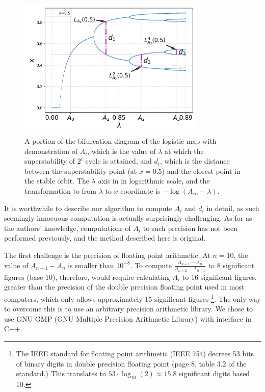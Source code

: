 \begin{figure}
	\centering
	\includegraphics[width=0.8\textwidth]{./figures/demonstration of feigenbaum constants.png}
	\caption{ 
		A portion of the bifurcation diagram of the logistic map with demonstration of  $A_i$, which is the value of $\lambda$ at which the superstability of $2^i$ cycle is attained, and $d_i$, which is the distance between the superstability point (at $x=0.5$) and the closest point in the stable orbit.
		The $\lambda$ axis in in logarithmic scale, and the transformation to from $\lambda$ to $x$ coordinate is $-\log(A_{\infty} - \lambda)$.
	}
	\label{fig:demonstration of feigenbaum constants on logistic map}
\end{figure}

It is worthwhile to describe our algorithm to compute $A_i$ and $d_i$ in detail, as such seemingly innocuous computation is actually surprisingly challenging.
As for as the authors' knowledge, computations of $A_i$ to such precision has not been performed previously, and the method described here is original.

The first challenge is the precision of floating point arithmetic.
At $n = 10$, the value of $A_{n+1} -A_{n} $ is smaller than $ 10^{-8}$. 
To compute $\frac{A_{n+1} - A_n}{A_{n+2} - A_{n+1}}$ to $8$ significant figures (base 10), therefore, would require calculating $A_i$ to 16 significant figures, greater than the precision of the double precision floating point used in most computers, which only allows approximately 15 significant figures
\footnote{
	The IEEE standard for floating point arithmetic \cite{IEEE_floating_point} (IEEE 754) decrees 53 bits of binary digits in double precision floating point (page 8, table 3.2 of the standard.) This translates to $53 \cdot \log_{10}(2) \approx 15.8$ significant digits based 10.
}.
The only way to overcome this is to use an arbitrary precision arithmetic library. 
We chose to use GNU GMP (GNU Multiple Precision Arithmetic Library) \cite{GMP} with interface in C++.

